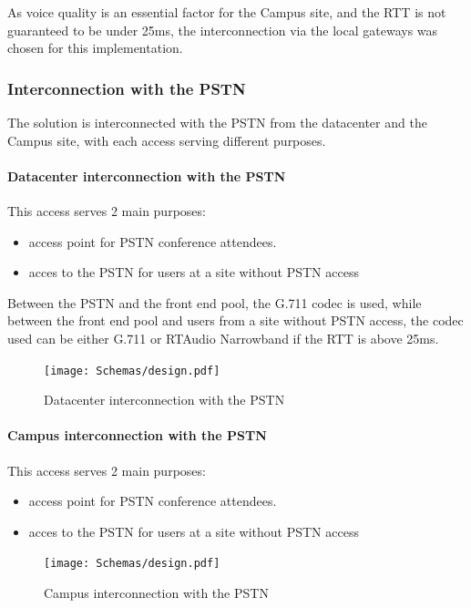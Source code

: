 	As voice quality is an essential factor for the Campus site, and the RTT is not guaranteed to be under 25ms, the interconnection via the local gateways was chosen for this implementation.
	
	
\subsubsection{Interconnection with the PSTN}

	The solution is interconnected with the PSTN from the datacenter and the Campus site, with each access serving different purposes.
	
	\paragraph{Datacenter interconnection with the PSTN}
	This access serves 2 main purposes:
	\begin{itemize}
		\item access point for PSTN conference attendees.
		\item acces to the PSTN for users at a site without PSTN access
	\end{itemize}
	
	Between the PSTN and the front end pool, the G.711 codec is used, while between the front end pool and users from a site without PSTN access, the codec used can be either G.711 or RTAudio Narrowband if the RTT is above 25ms.
	\begin{figure}[H]
		\centering
		\texttt{[image: Schemas/design.pdf]}
		\caption{Datacenter interconnection with the PSTN}
		\label{fig:case_pstn_datacenter}
	\end{figure}
		
	
	\paragraph{Campus interconnection with the PSTN}
	This access serves 2 main purposes:
	\begin{itemize}
		\item access point for PSTN conference attendees.
		\item acces to the PSTN for users at a site without PSTN access
	\end{itemize}
		
	\begin{figure}[H]
		\centering
		\texttt{[image: Schemas/design.pdf]}
		\caption{Campus interconnection with the PSTN}
		\label{fig:case_pstn_campus}
	\end{figure}

